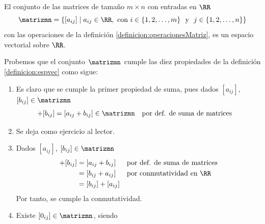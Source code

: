 \begin{theorem}{}{}
    El conjunto de las matrices de tamaño $m \times n$ con entradas en $\RR$
    $$\matrizmn = \left\{ [ a_{ij} ] \mid a_{ij} \in \RR, \text{ con } i \in \{ 1, 2, \dots, m \} \text{ ~y~ } j \in \{ 1, 2, \dots, n \} \right\}$$
    con las operaciones de la definición \ref{definicion:operacionesMatriz}, es un espacio vectorial sobre $\RR$.

    \tcblower
    \demostracion Probemos que el conjunto $\matrizmn$ cumple las diez propiedades de la definición \ref{definicion:espvec} como sigue:
    \begin{enumerate}[label=\roman*), topsep=6pt, itemsep=0pt]
        \item Es claro que se cumple la primer propiedad de suma, pues dados $[ a_{ij} ]$, $[ b_{ij} ] \in \matrizmn$
        \begin{align*}
            [ a_{ij} ] + [ b_{ij} ] & = [ a_{ij} +b_{ij} ] \in \matrizmn && \text{por def. de suma de matrices}
        \end{align*}
        \item Se deja como ejercicio al lector.
        \item Dados $[ a_{ij} ]$, $[ b_{ij} ] \in \matrizmn$
        \begin{align*}
            [ a_{ij} ] + [ b_{ij} ] & = [ a_{ij} +b_{ij} ] && \text{por def. de suma de matrices} \\
            & = [ b_{ij} + a_{ij} ] && \text{por conmutatividad en $\RR$} \\
            & = [ b_{ij} ] + [ a_{ij} ]
        \end{align*}
        Por tanto, se cumple la conmutatividad.
        \item Existe $[ 0_{ij} ] \in \matrizmn$, siendo
        \begin{matrizn}
        \end{matrizn}

\end{enumerate}
\end{theorem}
